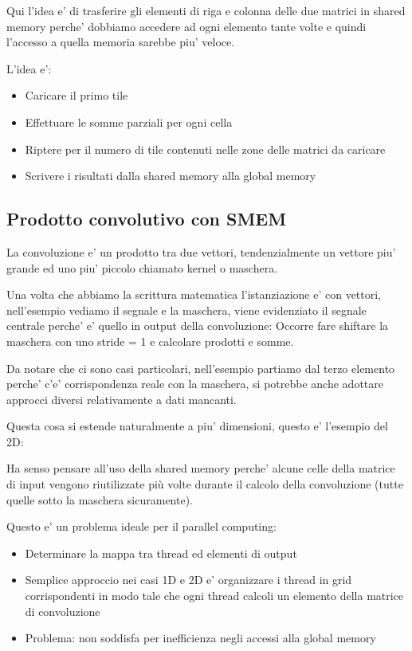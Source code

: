Qui l'idea e' di trasferire gli elementi di riga e colonna delle due matrici in shared memory perche' dobbiamo accedere ad ogni elemento tante volte e quindi l'accesso a quella memoria sarebbe piu' veloce.


L'idea e':
\begin{itemize}
    \item Caricare il primo tile 
    \item Effettuare le somme parziali per ogni cella
    \item Riptere per il numero di tile contenuti nelle zone delle matrici da caricare
    \item Scrivere i risultati dalla shared memory alla global memory
\end{itemize}

\subsection{Prodotto convolutivo con SMEM}
La convoluzione e' un prodotto tra due vettori, tendenzialmente un vettore piu' grande ed uno piu' piccolo chiamato kernel o maschera.

Una volta che abbiamo la scrittura matematica l'istanziazione e' con vettori, nell'esempio vediamo il segnale e la maschera, viene evidenziato il segnale centrale perche' e' quello in output della convoluzione:
Occorre fare shiftare la maschera con uno stride = 1 e calcolare prodotti e somme.

Da notare che ci sono casi particolari, nell'esempio partiamo dal terzo elemento perche' c'e' corrispondenza reale con la maschera, si potrebbe anche adottare approcci diversi relativamente a dati mancanti.

Questa cosa si estende naturalmente a piu' dimensioni, questo e' l'esempio del 2D:

Ha senso pensare all'uso della shared memory perche' alcune celle della matrice di input vengono riutilizzate più volte durante il calcolo della convoluzione (tutte quelle sotto la maschera sicuramente).

Questo e' un problema ideale per il parallel computing:
\begin{itemize}
    \item Determinare la mappa tra thread ed elementi di output
    \item Semplice approccio nei casi 1D e 2D e' organizzare i thread in grid corrispondenti in modo tale che ogni thread calcoli un elemento della matrice di convoluzione 
    \item Problema: non soddisfa per inefficienza negli accessi alla global memory
\end{itemize}

